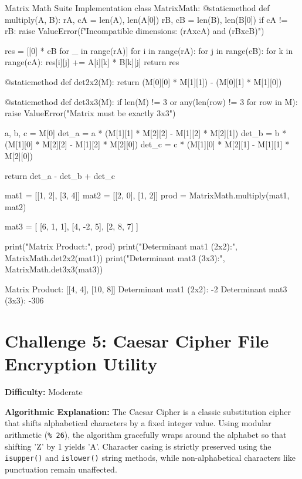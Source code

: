 \begin{pythoncode}{Matrix Math Suite Implementation}
class MatrixMath:
    @staticmethod
    def multiply(A, B):
        rA, cA = len(A), len(A[0])
        rB, cB = len(B), len(B[0])
        if cA != rB:
            raise ValueError(f"Incompatible dimensions: ({rA}x{cA}) and ({rB}x{cB})")
        
        res = [[0] * cB for _ in range(rA)]
        for i in range(rA):
            for j in range(cB):
                for k in range(cA):
                    res[i][j] += A[i][k] * B[k][j]
        return res
        
    @staticmethod
    def det2x2(M):
        return (M[0][0] * M[1][1]) - (M[0][1] * M[1][0])

    @staticmethod
    def det3x3(M):
        if len(M) != 3 or any(len(row) != 3 for row in M):
            raise ValueError("Matrix must be exactly 3x3")
        
        a, b, c = M[0]
        det_a = a * (M[1][1] * M[2][2] - M[1][2] * M[2][1])
        det_b = b * (M[1][0] * M[2][2] - M[1][2] * M[2][0])
        det_c = c * (M[1][0] * M[2][1] - M[1][1] * M[2][0])
        
        return det_a - det_b + det_c

mat1 = [[1, 2], [3, 4]]
mat2 = [[2, 0], [1, 2]]
prod = MatrixMath.multiply(mat1, mat2)

mat3 = [
    [6, 1, 1],
    [4, -2, 5],
    [2, 8, 7]
]

print("Matrix Product:", prod)
print("Determinant mat1 (2x2):", MatrixMath.det2x2(mat1))
print("Determinant mat3 (3x3):", MatrixMath.det3x3(mat3))
\end{pythoncode}

\begin{outputbox}
Matrix Product: [[4, 4], [10, 8]]
Determinant mat1 (2x2): -2
Determinant mat3 (3x3): -306
\end{outputbox}

\section{Challenge 5: Caesar Cipher File Encryption Utility}

\textbf{Difficulty:} Moderate

\textbf{Algorithmic Explanation:}
The Caesar Cipher is a classic substitution cipher that shifts alphabetical characters by a fixed integer value. Using modular arithmetic (\texttt{\% 26}), the algorithm gracefully wraps around the alphabet so that shifting 'Z' by 1 yields 'A'. Character casing is strictly preserved using the \texttt{isupper()} and \texttt{islower()} string methods, while non-alphabetical characters like punctuation remain unaffected.

